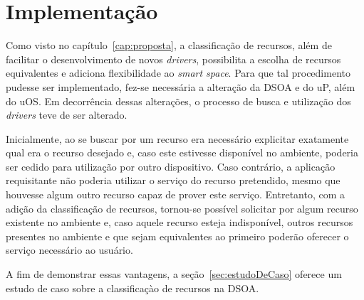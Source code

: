 \chapter{Implementação}

Como visto no capítulo~\ref{cap:proposta}, a classificação de recursos, além de facilitar o desenvolvimento de novos \emph{drivers}, possibilita a escolha de recursos equivalentes e adiciona flexibilidade ao \emph{smart space}. Para que tal procedimento pudesse ser implementado, fez-se necessária a alteração da DSOA e do uP, além do uOS. Em decorrência dessas alterações, o processo de busca e utilização dos \emph{drivers} teve de ser alterado.

Inicialmente, ao se buscar por um recurso era necessário explicitar exatamente qual era o recurso desejado e, caso este estivesse disponível no ambiente, poderia ser cedido para utilização por outro dispositivo. Caso contrário, a aplicação requisitante não poderia utilizar o serviço do recurso pretendido, mesmo que houvesse algum outro recurso capaz de prover este serviço. Entretanto, com a adição da classificação de recursos, tornou-se possível solicitar por algum recurso existente no ambiente e, caso aquele recurso esteja indisponível, outros recursos presentes no ambiente e que sejam equivalentes ao primeiro poderão oferecer o serviço necessário ao usuário.

A fim de demonstrar essas vantagens, a seção~\ref{sec:estudoDeCaso} oferece um estudo de caso sobre a classificaçào de recursos na DSOA.



